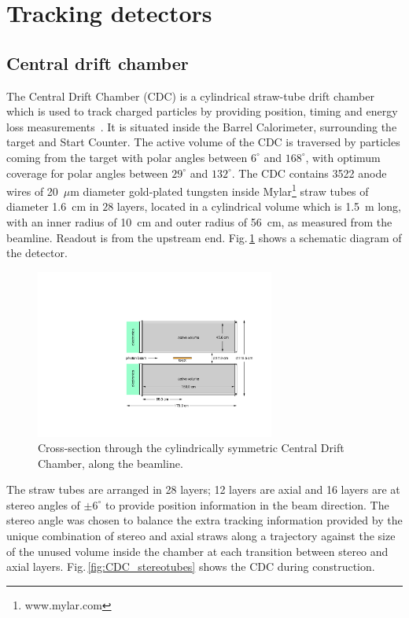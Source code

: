\section{Tracking detectors \label{sec:tracking}}
\subsection[Central drift chamber]{Central drift chamber \label{sec:cdc}}

The Central Drift Chamber (CDC) is a cylindrical straw-tube drift chamber which is used to track charged particles by providing position, timing and energy loss measurements~\cite{GlueXCDCNIM}.
It is situated inside the Barrel Calorimeter, surrounding the target and Start Counter. 
The active volume of the CDC is traversed
by particles coming from the target with polar angles between $6^{\circ}$ and $168^{\circ}$, with optimum 
coverage for polar angles between $29^{\circ}$ and $132^{\circ}$.  
The CDC contains 3522 anode wires of 20~$\mu$m diameter gold-plated tungsten inside Mylar\footnote{www.mylar.com} straw tubes of diameter 1.6~cm in $28$ layers,
located in a cylindrical volume which is 1.5~m long, with an inner radius of 10~cm and outer radius of 56~cm, as measured from the beamline.  
Readout is from the upstream end. 
Fig.\,\ref{fig:CDC_schematic} shows a schematic diagram of the detector.

\begin{figure}[tbp]
\begin{center}
\includegraphics[width=0.7\textwidth]{figures/CDC_schematic.pdf}  
\caption{\label{fig:CDC_schematic}          
  Cross-section through the cylindrically symmetric Central Drift Chamber, along the beamline.}  
\end{center}
\end{figure}

The straw tubes are arranged in 28 layers; 12 layers are axial and 16 layers are at stereo angles of $\pm 6^{\circ}$ to provide position information in the beam direction.
The stereo angle was chosen to balance the extra tracking information provided by the unique combination of stereo and axial straws along a trajectory against the size of the unused volume inside the chamber at each transition between stereo and axial layers. 
Fig.\,\ref{fig:CDC_stereotubes} shows the CDC during construction. 

